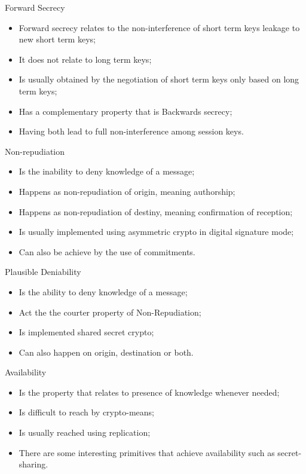 \documentclass[12pt,table,xcolor={dvipsnames}]{beamer}
\begin{document}
\begin{frame}{Forward Secrecy}
\begin{itemize}
\item Forward secrecy relates to the non-interference of short term keys leakage to new short term keys;\pause
\item It does not relate to long term keys;\pause
\item Is usually obtained by the negotiation of short term keys only based on long term keys;\pause
\item Has a complementary property that is Backwards secrecy;\pause
\item Having both lead to full non-interference among session keys.
\end{itemize}
\end{frame}

\begin{frame}{Non-repudiation}
\begin{itemize}
\item Is the inability to deny knowledge of a message;\pause
\item Happens as non-repudiation of origin, meaning authorship;\pause
\item Happens as non-repudiation of destiny, meaning confirmation of reception;\pause
\item Is usually implemented using asymmetric crypto in digital signature mode;\pause
\item Can also be achieve by the use of commitments.
\end{itemize}
\end{frame}

\begin{frame}{Plausible Deniability}
\begin{itemize}
\item Is the ability to deny knowledge of a message;\pause
\item Act the the courter property of Non-Repudiation;\pause
\item Is implemented shared secret crypto;\pause
\item Can also happen on origin, destination or both.
\end{itemize}
\end{frame}

\begin{frame}{Availability}
\begin{itemize}
\item Is the property that relates to presence of knowledge whenever needed;\pause
\item Is difficult to reach by crypto-means;\pause
\item Is usually reached using replication;\pause
\item There are some interesting primitives that achieve availability such as secret-sharing.
\end{itemize}
\end{frame}
\end{document}
